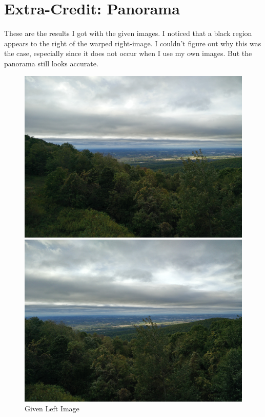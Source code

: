 \section{Extra-Credit: Panorama}

These are the results I got with the given images.
I noticed that a black region appears to the right of the warped
right-image. I couldn't figure out why this was the case,
especially since it does not occur when I use my own images.
But the panorama still looks accurate.

\begin{figure}[H]
  \centering
  \begin{minipage}{0.39\textwidth}
    \includegraphics[width=\textwidth]{images/given-left.jpg}
    \caption{Given Left Image}
    \label{fig:left-image}
  \end{minipage}
  \hfill
  \begin{minipage}{0.39\textwidth}
    \includegraphics[width=\textwidth]{images/given-right.jpg}

\end{minipage}
\end{figure}
